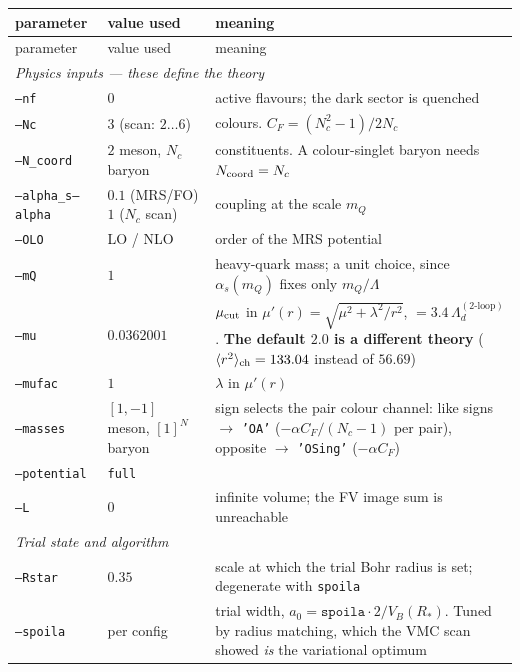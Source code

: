 \documentclass[11pt]{article}
\newcommand{\rch}{\langle r^2\rangle_{\rm ch}}
\newcommand{\code}[1]{\texttt{\small #1}}
\begin{document}
{\small
\begin{longtable}{@{}p{3.0cm}p{3.0cm}>{\raggedright\arraybackslash}p{9.6cm}@{}}
\toprule
parameter & value used & meaning \\
\midrule
\endfirsthead
\toprule
parameter & value used & meaning \\
\midrule
\endhead
\multicolumn{3}{l}{\emph{Physics inputs --- these define the theory}}\\
\code{--nf}        & $0$ & active flavours; the dark sector is quenched \\
\code{--Nc}        & $3$ (scan: $2\dots6$) & colours.  $C_F=(N_c^2-1)/2N_c$ \\
\code{--N\_coord}  & $2$ meson, $N_c$ baryon & constituents.  A colour-singlet baryon needs
  $N_{\rm coord}=N_c$ \\
\code{--alpha\_s}\newline \code{--alpha} & $0.1$ (MRS/FO)\newline $1$ ($N_c$ scan) & coupling at the scale
  $m_Q$ \\
\code{--OLO}       & LO / NLO & order of the MRS potential \\
\code{--mQ}        & $1$ & heavy-quark mass; a unit choice, since $\alpha_s(m_Q)$ fixes only
  $m_Q/\Lambda$ \\
\code{--mu}        & $0.0362001$ & $\mu_{\rm cut}$ in $\mu'(r)=\sqrt{\mu^2+\lambda^2/r^2}$,
  $=3.4\,\Lambda^{(2\text{-loop})}_d$.  \textbf{The default $2.0$ is a different theory}
  ($\rch=133.04$ instead of $56.69$) \\
\code{--mufac}     & $1$ & $\lambda$ in $\mu'(r)$ \\
\code{--masses}    & $[1,-1]$ meson, $[1]^{N}$ baryon & sign selects the pair colour channel:
  like signs $\to$ \code{'OA'} ($-\alpha C_F/(N_c{-}1)$ per pair), opposite $\to$
  \code{'OSing'} ($-\alpha C_F$) \\
\code{--potential} & \code{full} & \\
\code{--L}         & $0$ & infinite volume; the FV image sum is unreachable \\
\midrule
\multicolumn{3}{l}{\emph{Trial state and algorithm}}\\
\code{--Rstar}     & $0.35$ & scale at which the trial Bohr radius is set; degenerate with
  \code{spoila} \\
\code{--spoila}    & per config & trial width, $a_0=\texttt{spoila}\cdot2/V_B(R_*)$.  Tuned by
  radius matching, which the VMC scan showed \emph{is} the variational optimum \\

\end{longtable}}
\end{document}
